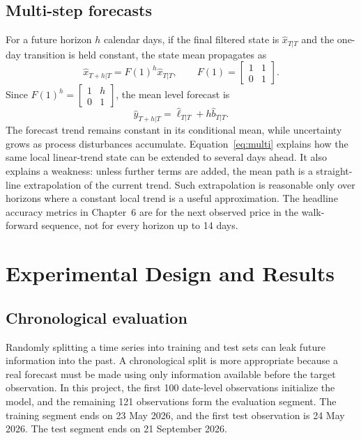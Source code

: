 \documentclass[12pt,a4paper,oneside]{report}
\numberwithin{equation}{chapter}
\numberwithin{figure}{chapter}
\numberwithin{table}{chapter}
\theoremstyle{definition}
\theoremstyle{plain}
\newcommand{\1}{\mathbf{1}}
\newcommand{\hatt}[1]{\widehat{#1}}
\begin{document}
\section{Multi-step forecasts}
For a future horizon $h$ calendar days, if the final filtered state is $\hatt{x}_{T|T}$ and the one-day transition is held constant, the state mean propagates as
\begin{equation}
  \hatt{x}_{T+h|T}=F(1)^h\hatt{x}_{T|T},\qquad
  F(1)=\begin{bmatrix}1&1\\0&1\end{bmatrix}.
\end{equation}
Since $F(1)^h=\begin{bmatrix}1&h\\0&1\end{bmatrix}$, the mean level forecast is
\begin{equation}
  \hatt{y}_{T+h|T}=\hatt{\ell}_{T|T}+h\hatt{b}_{T|T}.
  \label{eq:multi}
\end{equation}
The forecast trend remains constant in its conditional mean, while uncertainty grows as process disturbances accumulate. Equation~\eqref{eq:multi} explains how the same local linear-trend state can be extended to several days ahead. It also explains a weakness: unless further terms are added, the mean path is a straight-line extrapolation of the current trend. Such extrapolation is reasonable only over horizons where a constant local trend is a useful approximation. The headline accuracy metrics in Chapter~6 are for the next observed price in the walk-forward sequence, not for every horizon up to 14 days.

\chapter{Experimental Design and Results}

\section{Chronological evaluation}
Randomly splitting a time series into training and test sets can leak future information into the past. A chronological split is more appropriate because a real forecast must be made using only information available before the target observation. In this project, the first 100 date-level observations initialize the model, and the remaining 121 observations form the evaluation segment. The training segment ends on 23 May 2026, and the first test observation is 24 May 2026. The test segment ends on 21 September 2026.
\end{document}
